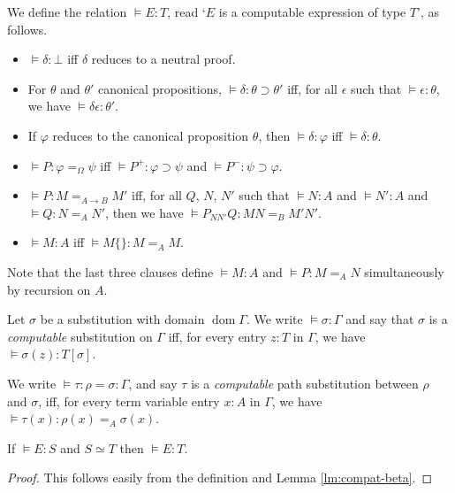 \documentclass[a4paper,UKenglish]{lipics-v2016}
\newcommand*{\dom}{\ensuremath{\operatorname{dom}}}
\theoremstyle{plain}
\theoremstyle{definition}
\begin{document}
\begin{definition}
We define the relation $\models E : T$, read `$E$ is a computable expression of type $T$', as follows.
\begin{itemize}
\item
$\models \delta : \bot$ iff $\delta$ reduces to a neutral proof.
\item
For $\theta$ and $\theta'$ canonical propositions, $\models \delta : \theta \supset \theta'$ iff, for all $\epsilon$ such that $\models \epsilon : \theta$, we have $\models \delta \epsilon : \theta'$.
\item
If $\varphi$ reduces to the canonical proposition $\theta$, then $\models \delta : \varphi$ iff $\models \delta : \theta$.
\item
$\models P : \varphi =_\Omega \psi$ iff $\models P^+ : \varphi \supset \psi$ and $\models P^- : \psi \supset \varphi$.
\item
$\models P : M =_{A \rightarrow B} M'$ iff, for all $Q$, $N$, $N'$ such that $\models N : A$ and $\models N' : A$ and $\models Q : N =_A N'$, then we have $\models P_{NN'}Q : MN =_B M'N'$.
\item
$\models M : A$ iff $\models M \{\} : M =_A M$.
\end{itemize}
Note that the last three clauses define $\models M : A$ and $\models P : M =_A N$ simultaneously by recursion on $A$.
\end{definition}

\begin{definition}
Let $\sigma$ be a substitution with domain $\dom \Gamma$.  We write $\models \sigma : \Gamma$ and say that
$\sigma$ is a \emph{computable} substitution on $\Gamma$ iff, for every entry $z : T$ in $\Gamma$, we have $\models \sigma(z) : T [ \sigma ]$.

We write $\models \tau : \rho = \sigma : \Gamma $, and say $\tau$ is a \emph{computable} path substitution between $\rho$ and $\sigma$, iff, for every term variable entry $x : A$ in $\Gamma$, we have $\models \tau(x) : \rho(x) =_A \sigma(x)$.
\end{definition}

\begin{lemma}[Conversion]
\label{lm:conv-compute}
If $\models E : S$ and $S \simeq T$ then $\models E : T$.
\end{lemma}

\begin{proof}
This follows easily from the definition and Lemma \ref{lm:compat-beta}.
\end{proof}
\end{document}
